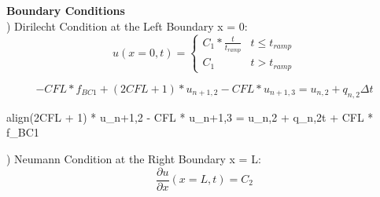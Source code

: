 \documentclass[10pt, letter, showtrims]{extarticle}
\newcommand{\boxedeq}[2]{\begin{empheq}[box={\fboxsep=6pt\fbox}]{align}\label{#1}#2\end{empheq}}
\begin{document}
		\noindent
		\textbf{Boundary Conditions} \\
		
		) Dirilecht Condition at the Left Boundary x = 0:	\\
		
		\begin{equation}
			u(x=0, t) = \begin{cases} 
          					C_{1} * \frac{t}{t_{ramp}} & t\leq t_{ramp} \\
          					C_{1}                      & t > t_{ramp}
       					\end{cases}
    		\end{equation}
    		
    		\begin{equation}
			-CFL * f_{BC1} + (2CFL + 1) * u_{n+1,2} - CFL * u_{n+1,3} = u_{n,2} + q_{n,2}\Delta t
		\end{equation} 
		
		\boxedeq{}{(2CFL + 1) * u_{n+1,2} - CFL * u_{n+1,3} = u_{n,2} + q_{n,2}\Delta t + CFL * f_{BC1}} 
		
		) Neumann Condition at the Right Boundary x = L: \\
		
		\begin{equation}
			\frac{\partial u}{\partial x}(x=L, t) = C_{2}
    		\end{equation}
%    		
%    		
%    		
%    		
%    		
%    		
%    		
%    		
%    		
%    		
    		
\end{document}
